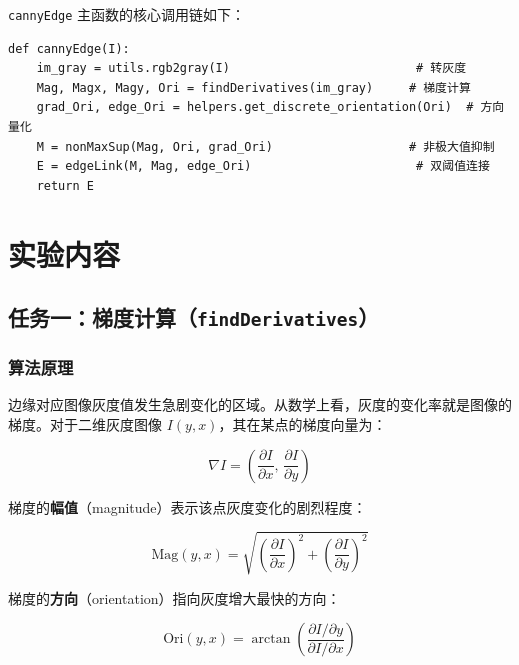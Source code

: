 \documentclass[12pt,a4paper]{ctexart}
\begin{document}
\texttt{cannyEdge} 主函数的核心调用链如下：

\begin{lstlisting}
def cannyEdge(I):
    im_gray = utils.rgb2gray(I)                          # 转灰度
    Mag, Magx, Magy, Ori = findDerivatives(im_gray)     # 梯度计算
    grad_Ori, edge_Ori = helpers.get_discrete_orientation(Ori)  # 方向量化
    M = nonMaxSup(Mag, Ori, grad_Ori)                   # 非极大值抑制
    E = edgeLink(M, Mag, edge_Ori)                       # 双阈值连接
    return E
\end{lstlisting}

\section{实验内容}

\subsection{任务一：梯度计算（\texttt{findDerivatives}）}

\subsubsection{算法原理}

边缘对应图像灰度值发生急剧变化的区域。从数学上看，灰度的变化率就是图像的梯度。对于二维灰度图像 $I(y, x)$，其在某点的梯度向量为：

\begin{equation}
  \nabla I = \left(\frac{\partial I}{\partial x},\, \frac{\partial I}{\partial y}\right)
\end{equation}

梯度的\textbf{幅值}（magnitude）表示该点灰度变化的剧烈程度：

\begin{equation}
  \text{Mag}(y, x) = \sqrt{\left(\frac{\partial I}{\partial x}\right)^2 + \left(\frac{\partial I}{\partial y}\right)^2}
  \label{eq:mag}
\end{equation}

梯度的\textbf{方向}（orientation）指向灰度增大最快的方向：

\begin{equation}
  \text{Ori}(y, x) = \arctan\!\left(\frac{\partial I / \partial y}{\partial I / \partial x}\right)
  \label{eq:ori}
\end{equation}
\end{document}
